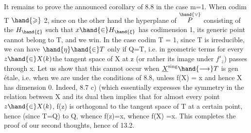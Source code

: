 It remains to prove the announced corollary of 8.8 in the case m=1.
When  codim T $\hand{\geqslant}$ 2, since on the other hand the hyperplane  of $\overset{\hand{\vee}}{P}$ consisting of the
$H_{\hand{\xi}}$ such that $x\hand{\in} H_{\hand{\xi}}$ has codimension 1, its generic point  cannot
belong to T, and we win. In the case codim T = 1, since T is
irreducible, we can have $\hand{\eta}\hand{\in} T$ only if Q=T,
i.e. in geometric terms   for every $z\hand{\in} X(k)$the tangent space
of X at z (or rather its image under $f'_{z}$) passes through x. Let us show that
this cannot occur when $\underline{X}^{\mathrm{sing}}\hand{\longrightarrow}T$ is gen étale, i.e.
when we are under the conditions of 8.8, unless f(X) = \hand{\{}x\hand{\}} and hence X
has dimension 0. Indeed, 8.7 c) (which essentially expresses the
symmetry  in the relation between X and its dual \hand{)} then implies that
for almost every point $z\hand{\in} X(k)$, f(z) is orthogonal to the tangent space
of T at a certain point, hence (since T=Q)  to Q, whence f(z)=x, whence
f(X) =\hand{\{}x\hand{\}}. This completes the proof of our second thoughts, hence of 13.2.

